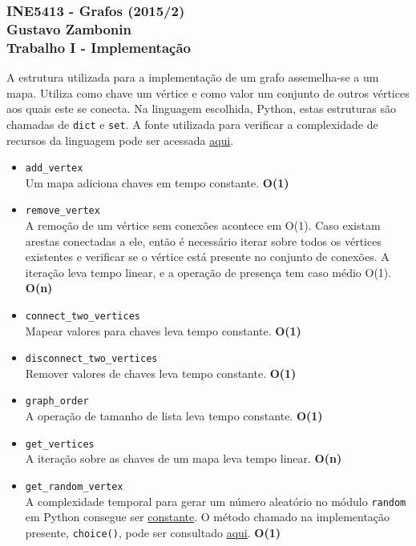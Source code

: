 \documentclass{article}
\begin{document}
\subsubsection*{INE5413 - Grafos (2015/2) \\
    Gustavo Zambonin \\
    Trabalho I - Implementação
}

A estrutura utilizada para a implementação de um grafo assemelha-se a um mapa.
Utiliza como chave um vértice e como valor um conjunto de outros vértices aos
quais este se conecta. Na linguagem escolhida, Python, estas estruturas são
chamadas de \texttt{dict} e \texttt{set}. A fonte utilizada para verificar a
complexidade de recursos da linguagem pode ser acessada
\href{https://wiki.python.org/moin/TimeComplexity}{aqui}.

\begin{itemize}
    \item \texttt{add\_vertex} \\
    Um mapa adiciona chaves em tempo constante. \textbf{O(1)}

    \item \texttt{remove\_vertex} \\
    A remoção de um vértice sem conexões acontece em O(1). Caso existam arestas
    conectadas a ele, então é necessário iterar sobre todos os vértices
    existentes e verificar se o vértice está presente no conjunto de conexões.
    A iteração leva tempo linear, e a operação de presença tem caso médio O(1).
    \textbf{O(n)}

    \item \texttt{connect\_two\_vertices} \\
    Mapear valores para chaves leva tempo constante. \textbf{O(1)}

    \item \texttt{disconnect\_two\_vertices} \\
    Remover valores de chaves leva tempo constante. \textbf{O(1)}

    \item \texttt{graph\_order} \\
    A operação de tamanho de lista leva tempo constante. \textbf{O(1)}

    \item \texttt{get\_vertices} \\
    A iteração sobre as chaves de um mapa leva tempo linear. \textbf{O(n)}

    \item \texttt{get\_random\_vertex} \\
    A complexidade temporal para gerar um número aleatório no módulo
    \texttt{random} em Python consegue ser
    \href{https://docs.python.org/2/library/random.html}{constante}. O método
    chamado na implementação presente, \texttt{choice()}, pode ser consultado
    \href{https://hg.python.org/cpython/file/2.7/Lib/random.py#l273}{aqui}.
    \textbf{O(1)}


\end{itemize}
\end{document}
